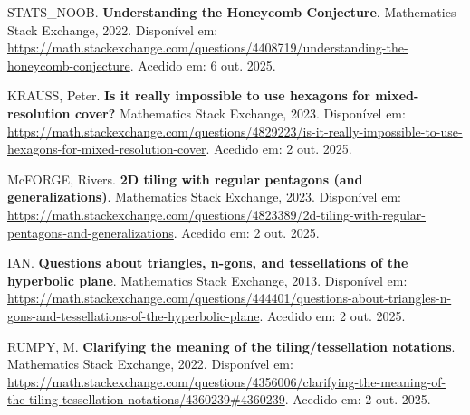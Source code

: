 \documentclass[12pt,a4paper,oneside]{extarticle}
\begin{document}
\begin{thebibliography}{9}

STATS\_NOOB. \textbf{Understanding the Honeycomb Conjecture}. Mathematics Stack Exchange, 2022. Disponível em: \url{https://math.stackexchange.com/questions/4408719/understanding-the-honeycomb-conjecture}. Acedido em: 6 out. 2025.

KRAUSS, Peter. \textbf{Is it really impossible to use hexagons for mixed-resolution cover?} Mathematics Stack Exchange, 2023. Disponível em: \url{https://math.stackexchange.com/questions/4829223/is-it-really-impossible-to-use-hexagons-for-mixed-resolution-cover}. Acedido em: 2 out. 2025.

McFORGE, Rivers. \textbf{2D tiling with regular pentagons (and generalizations)}. Mathematics Stack Exchange, 2023. Disponível em: \url{https://math.stackexchange.com/questions/4823389/2d-tiling-with-regular-pentagons-and-generalizations}. Acedido em: 2 out. 2025.

IAN. \textbf{Questions about triangles, n-gons, and tessellations of the hyperbolic plane}. Mathematics Stack Exchange, 2013. Disponível em: \url{https://math.stackexchange.com/questions/444401/questions-about-triangles-n-gons-and-tessellations-of-the-hyperbolic-plane}. Acedido em: 2 out. 2025.

RUMPY, M. \textbf{Clarifying the meaning of the tiling/tessellation notations}. Mathematics Stack Exchange, 2022. Disponível em: \url{https://math.stackexchange.com/questions/4356006/clarifying-the-meaning-of-the-tiling-tessellation-notations/4360239#4360239}. Acedido em: 2 out. 2025.

\end{thebibliography}

\label{fim}
\end{document}
